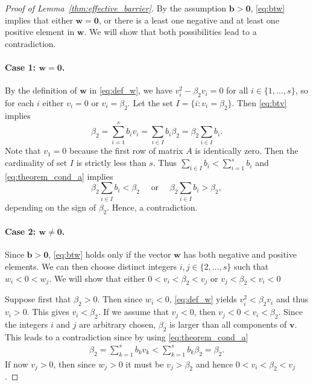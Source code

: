 \begin{proof}[Proof of Lemma~\ref{thm:effective_barrier}]
	By the assumption $\bm{b} > \bm{0}$, \eqref{eq:btw} implies that either
	$\bm{w} = \bm{0}$, or there is a least one negative and at least one positive 
	element in $\bm{w}$.
	We will show that both possibilities lead to a contradiction.

	\paragraph{Case 1: $\bm{w} = \bm{0}$.}
	By the definition of $\bm{w}$ in \eqref{eq:def_w}, we have $v_i^2 - \beta_2 v_i = 0$ 
	for all $i \in \{1, \dots, s\}$, 	so for each $i$ either $v_i = 0$ or $v_i = \beta_2$.
	Let the set $I = \{i : v_i = \beta_2\}$. 
	Then \eqref{eq:btv} implies 
	\begin{equation*}
		\beta_2 = \sum_{i=1}^s b_i v_i = \sum_{i \in I}b_i\beta_2 = \beta_2\sum_{i \in I}b_i.
	\end{equation*}
	Note that $v_1 = 0$ because the first row of matrix $A$ is identically zero. 
	Then the cardinality of set $I$ is strictly less than $s$. 
	Thus $\sum_{i\in I}b_i < \sum_{i=1}^s b_i$ and \eqref{eq:theorem_cond_a} 
	implies
	\begin{equation*}
		\beta_2\sum_{i \in I}b_i < \beta_2 \quad \text{ or } \quad \beta_2\sum_{i \in I}b_i > \beta_2,
	\end{equation*}
	depending on the sign of $\beta_2$.
	Hence, a contradiction.

	\paragraph{Case 2: $\bm{w} \neq \bm{0}$.}
	Since $\bm{b} > \bm{0}$, \eqref{eq:btw} holds only if the vector 
	$\bm{w}$ has both negative and positive elements. 
	We can then choose distinct integers $i, j \in \{2, \dots, s\}$ such that 
	$w_i < 0 < w_j$.
	We will show that either $0 < v_i < \beta_2 < v_j$ or $v_j < \beta_2 < v_i< 0$

	Suppose first that $\beta_2 > 0$. 
	Then since $w_i < 0$, \eqref{eq:def_w} yields $v_i^2 < \beta_2v_i$ 
	and thus $v_i > 0$. 
	This gives $v_i < \beta_2$.
	If we assume that $v_j < 0$, then $v_j < 0 < v_i < \beta_2$.
	Since the integers $i$ and $j$ are arbitrary chosen, $\beta_2$ is larger 
	than all components of $\bm{v}$. 
    	This leads to a contradiction since by using \eqref{eq:theorem_cond_a}
    	\begin{align*}
    		\beta_2 = \sum_{k=1}^s b_k v_k < \sum_{k=1}^s b_k\beta_2 = \beta_2.
    	\end{align*}
    	If now $v_j > 0$, then since $w_j > 0$ it must be $v_j > \beta_2$ 
    	and hence $0< v_i < \beta_2 < v_j$.
    	

\end{proof}
